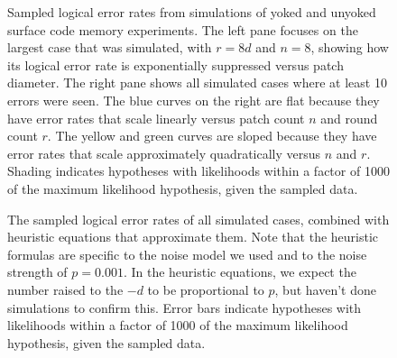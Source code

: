 \documentclass[onecolumn,unpublished,a4paper]{quantumarticle}
\theoremstyle{definition}
\theoremstyle{definition}
\theoremstyle{definition}
\begin{document}
\begin{figure}[h]
{    }
    \caption{
        Sampled logical error rates from simulations of yoked and unyoked surface code memory experiments.
        The left pane focuses on the largest case that was simulated, with $r=8d$ and $n=8$, showing how its logical error rate is exponentially suppressed versus patch diameter.
        The right pane shows all simulated cases where at least 10 errors were seen.
        The blue curves on the right are flat because they have error rates that scale linearly versus patch count $n$ and round count $r$.
        The yellow and green curves are sloped because they have error rates that scale approximately quadratically versus $n$ and $r$.
        Shading indicates hypotheses with likelihoods within a factor of 1000 of the maximum likelihood hypothesis, given the sampled data.
    }
    \label{fig:scaling_laws_focus}
\end{figure}

\begin{figure}[h]
    \centering
    \caption{
        The sampled logical error rates of all simulated cases, combined with heuristic equations that approximate them.
        Note that the heuristic formulas are specific to the noise model we used and to the noise strength of $p=0.001$.
        In the heuristic equations, we expect the number raised to the $-d$ to be proportional to $p$, but haven't done simulations to confirm this.
        Error bars indicate hypotheses with likelihoods within a factor of 1000 of the maximum likelihood hypothesis, given the sampled data.
    }
    \label{fig:scaling_laws_general}
\end{figure}
\end{document}
